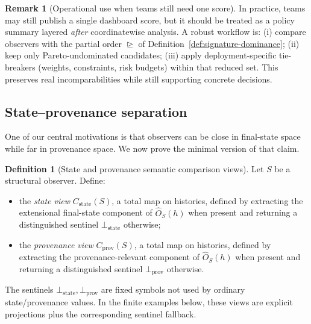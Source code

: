\documentclass[11pt,twoside]{article}
\theoremstyle{definition}
\newtheorem{definition}[theorem]{Definition}
\newtheorem{remark}[theorem]{Remark}
\begin{document}
\begin{remark}[Operational use when teams still need one score]
\label{rem:scalarization-operational-use}
In practice, teams may still publish a single dashboard score, but it should be treated as a policy summary layered \emph{after} coordinatewise analysis. A robust workflow is: (i) compare observers with the partial order \( \trianglerighteq \) of Definition~\ref{def:signature-dominance}; (ii) keep only Pareto-undominated candidates; (iii) apply deployment-specific tie-breakers (weights, constraints, risk budgets) within that reduced set. This preserves real incomparabilities while still supporting concrete decisions.
\end{remark}

\subsection{State--provenance separation}
\label{subsec:state-provenance-separation}

One of our central motivations is that observers can be close in final-state space while far in provenance space. We now prove the minimal version of that claim.

\begin{definition}[State and provenance semantic comparison views]
\label{def:state-prov-views}
Let \(S\) be a structural observer. Define:
\begin{itemize}[leftmargin=*]
  \item the \emph{state view} \(C_{\mathrm{state}}(S)\), a total map on histories, defined by extracting the extensional final-state component of \(\widehat{O}_S(h)\) when present and returning a distinguished sentinel \(\bot_{\mathrm{state}}\) otherwise;
  \item the \emph{provenance view} \(C_{\mathrm{prov}}(S)\), a total map on histories, defined by extracting the provenance-relevant component of \(\widehat{O}_S(h)\) when present and returning a distinguished sentinel \(\bot_{\mathrm{prov}}\) otherwise.
\end{itemize}
The sentinels \(\bot_{\mathrm{state}},\bot_{\mathrm{prov}}\) are fixed symbols not used by ordinary state/provenance values. In the finite examples below, these views are explicit projections plus the corresponding sentinel fallback.
\end{definition}
\end{document}
